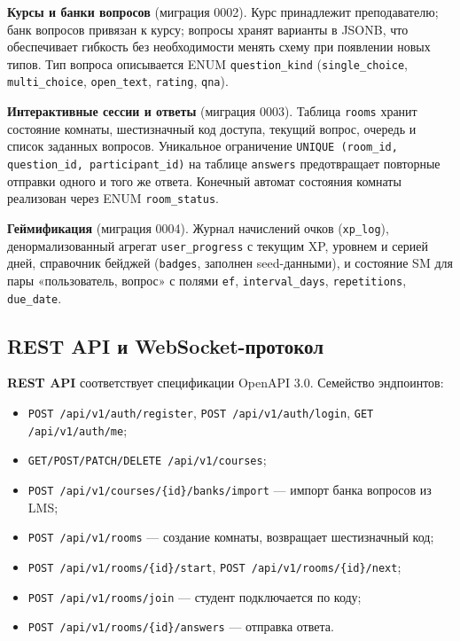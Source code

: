 \textbf{Курсы и банки вопросов} (миграция 0002).
Курс принадлежит преподавателю; банк вопросов привязан к курсу;
вопросы хранят варианты в JSONB, что обеспечивает гибкость
без необходимости менять схему при появлении новых типов.
Тип вопроса описывается ENUM \texttt{question\_kind}
(\texttt{single\_choice}, \texttt{multi\_choice}, \texttt{open\_text},
\texttt{rating}, \texttt{qna}).

\textbf{Интерактивные сессии и ответы} (миграция 0003).
Таблица \texttt{rooms} хранит состояние комнаты, шестизначный
код доступа, текущий вопрос, очередь и список заданных вопросов.
Уникальное ограничение
\texttt{UNIQUE (room\_id, question\_id, participant\_id)}
на таблице \texttt{answers} предотвращает повторные отправки
одного и того же ответа. Конечный автомат состояния комнаты
реализован через ENUM \texttt{room\_status}.

\textbf{Геймификация} (миграция 0004). Журнал начислений
очков (\texttt{xp\_log}), денормализованный агрегат
\texttt{user\_progress} с текущим XP, уровнем и серией дней,
справочник бейджей (\texttt{badges}, заполнен seed-данными),
и состояние SM для пары «пользователь, вопрос»
с полями \texttt{ef}, \texttt{interval\_days}, \texttt{repetitions},
\texttt{due\_date}.

\subsection{REST API и WebSocket-протокол}

\textbf{REST API} соответствует спецификации OpenAPI 3.0.
Семейство эндпоинтов:
\begin{itemize}[noitemsep]
    \item \texttt{POST /api/v1/auth/register},
          \texttt{POST /api/v1/auth/login},
          \texttt{GET  /api/v1/auth/me};
    \item \texttt{GET/POST/PATCH/DELETE /api/v1/courses};
    \item \texttt{POST /api/v1/courses/\{id\}/banks/import}
          --- импорт банка вопросов из LMS;
    \item \texttt{POST /api/v1/rooms} --- создание комнаты,
          возвращает шестизначный код;
    \item \texttt{POST /api/v1/rooms/\{id\}/start},
          \texttt{POST /api/v1/rooms/\{id\}/next};
    \item \texttt{POST /api/v1/rooms/join} --- студент подключается
          по коду;
    \item \texttt{POST /api/v1/rooms/\{id\}/answers} --- отправка
          ответа.
\end{itemize}

